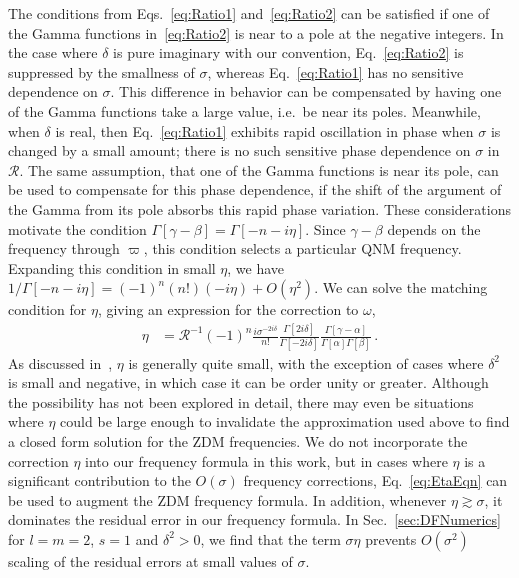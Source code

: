 \begin{refsection}
The conditions from Eqs.~\eqref{eq:Ratio1} and~\eqref{eq:Ratio2} can be satisfied if one of the Gamma functions in~\eqref{eq:Ratio2} is near to a pole at the negative integers. 
In the case where $\delta$ is pure imaginary with our convention, Eq.~\eqref{eq:Ratio2} is suppressed by the smallness of $\sigma$, whereas Eq.~\eqref{eq:Ratio1} has no sensitive dependence on $\sigma$. 
This difference in behavior can be compensated by having one of the Gamma functions take a large value, i.e.\ be near its poles.
Meanwhile, when $\delta$ is real, then Eq.~\eqref{eq:Ratio1} exhibits rapid oscillation in phase when $\sigma$ is changed by a small amount; there is no such sensitive phase dependence on $\sigma$ in $\mathcal R$. 
The same assumption, that one of the Gamma functions is near its pole, can be used to compensate for this phase dependence, if the shift of the argument of the Gamma from its pole absorbs this rapid phase variation.
These considerations motivate the condition $\Gamma[\gamma - \beta] = \Gamma[-n - i \eta]$. Since $\gamma - \beta$ depends on the frequency through $\varpi$, this condition selects a particular QNM frequency. 
Expanding this condition in small $\eta$, we have $1/\Gamma[-n - i \eta] = (-1)^n (n!) (-i \eta) + O(\eta^2)$. We can solve the matching condition for $\eta$, giving an expression for the correction to $\omega$,
\begin{align}
\label{eq:EtaEqn}
\eta & = \mathcal R^{-1} (-1)^n \frac{i  \sigma^{- 2 i \delta}}{n!}  \frac{\Gamma[2i\delta]}{\Gamma[-2 i \delta]}\frac{\Gamma[\gamma - \alpha]}{\Gamma[\alpha]\Gamma[\beta]}\,.
\end{align}
As discussed in~\cite{Yang:2013uba}, $\eta$ is generally quite small, with the exception of cases where $\delta^2$ is small and negative, in which case it can be order unity or greater. 
Although the possibility has not been explored in detail, there may even be situations where $\eta$ could be large enough to invalidate the approximation used above to find a closed form solution for the ZDM frequencies.
We do not incorporate the correction $\eta$ into our frequency formula in this work, but in cases where $\eta$ is a significant contribution to the $O(\sigma)$ frequency corrections, Eq.~\eqref{eq:EtaEqn} can be used to augment the ZDM frequency formula. 
In addition, whenever $\eta \gtrsim \sigma$, it dominates the residual error in our frequency formula. 
In Sec.~\ref{sec:DFNumerics} for $l=m=2$, $s=1$ and $\delta^2>0$, we find that the term $\sigma \eta$ prevents $O(\sigma^2)$ scaling of the residual errors at small values of $\sigma$.


\end{refsection}
